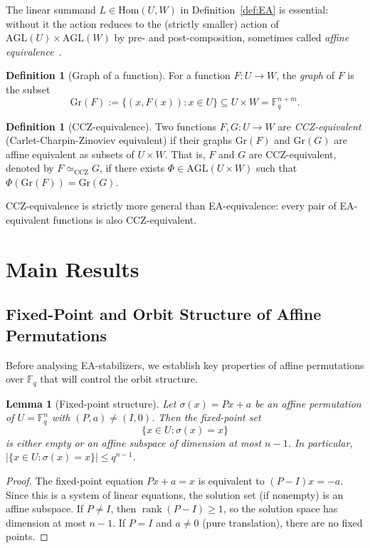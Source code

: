 \documentclass[11pt]{article}
\newtheorem{lemma}[theorem]{Lemma}
\theoremstyle{definition}
\newtheorem{definition}[theorem]{Definition}
\newcommand{\F}{\mathbb{F}}
\newcommand{\AGL}{\mathrm{AGL}}
\newcommand{\rank}{\operatorname{rank}}
\newcommand{\Hom}{\mathrm{Hom}}
\begin{document}
The linear summand $L\in\Hom(U,W)$ in Definition~\ref{def:EA} is essential:
without it the action reduces to the (strictly smaller) action of
$\AGL(U)\times\AGL(W)$ by pre- and post-composition, sometimes called
\emph{affine equivalence}~\cite{carlet2010}.

\begin{definition}[Graph of a function]
For a function $F: U \to W$, the \emph{graph} of $F$ is the subset
\[
   \mathrm{Gr}(F) := \{(x,F(x)) : x \in U\} \subseteq U \times W = \F_q^{n+m}.
\]
\end{definition}

\begin{definition}[CCZ-equivalence]
Two functions $F,G: U \to W$ are \emph{CCZ-equivalent} (Carlet-Charpin-Zinoviev equivalent)
if their graphs $\mathrm{Gr}(F)$ and $\mathrm{Gr}(G)$ are affine equivalent as subsets of $U \times W$.
That is, $F$ and $G$ are CCZ-equivalent, denoted by $F \simeq_{\mathrm{CCZ}} G$, if there exists
$\Phi \in \AGL(U \times W)$ such that $\Phi(\mathrm{Gr}(F)) = \mathrm{Gr}(G)$.
\end{definition}

CCZ-equivalence is strictly more general than EA-equivalence: every pair of EA-equivalent
functions is also CCZ-equivalent.

\section{Main Results}\label{sec:main}

\subsection{Fixed-Point and Orbit Structure of Affine Permutations}

Before analysing EA-stabilizers, we establish key properties of affine permutations
over $\F_q$ that will control the orbit structure.

\begin{lemma}[Fixed-point structure]\label{lem:affine-fixed}
Let $\sigma(x)=Px+a$ be an affine permutation of $U=\F_q^n$ with $(P,a)\neq(I,0)$.
Then the fixed-point set
\[
   \{x\in U:\sigma(x)=x\}
\]
is either empty or an affine subspace of dimension at most $n-1$.
In particular, $|\{x\in U:\sigma(x)=x\}|\le q^{n-1}$.
\end{lemma}

\begin{proof}
The fixed-point equation $Px+a=x$ is equivalent to $(P-I)x=-a$.
Since this is a system of linear equations, the solution set (if nonempty) is an
affine subspace. If $P\neq I$, then $\rank(P-I)\ge 1$, so the solution space
has dimension at most $n-1$. If $P=I$ and $a\neq 0$ (pure translation), there are
no fixed points.
\end{proof}
\end{document}
